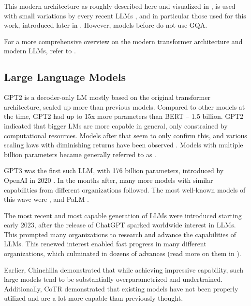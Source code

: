

This modern architecture as roughly described here and visualized in , is used with small variations by every recent \glspl{LLM} \cite{naveed_comprehensive_2023}, and in particular those used for this work, introduced later in .
However, models before  do not use \gls{GQA}.

For a more comprehensive overview on the modern transformer architecture and modern \glspl{LLM}, refer to \cite{naveed_comprehensive_2023}.

\subsection{Large Language Models}\label{sub:llm}

\gls{GPT2} \cite{radford_language_2019} is a decoder-only \gls{LM} mostly based on the original transformer architecture, scaled up more than previous models.
Compared to other models at the time, \gls{GPT2} had up to 15x more parameters than \gls{BERT} -- 1.5 billion.
\gls{GPT2} indicated that bigger \glspl{LM} are more capable in general, only constrained by computational resources.
Models after that seem to only confirm this, and various scaling laws with diminishing returns have been observed \cite{rae_scaling_2022, hoffmann_training_2022}.
Models with multiple billion parameters became generally referred to as .

\gls{GPT3} was the first such \gls{LLM}, with 176 billion parameters, introduced by \gls{OpenAI} in 2020 \cite{brown_language_2020}.
In the months after, many more models with similar capabilities from different organizations followed.
The most well-known models of this wave were ,  and \gls{PaLM} \cite{chowdhery_palm_2022}.


The most recent and most capable generation of \glspl{LLM} were introduced starting early 2023, after the release of \gls{ChatGPT} sparked worldwide interest in \glspl{LLM}.
This prompted many organizations to research and advance the capabilities of \glspl{LLM}.
This renewed interest enabled fast progress in many different organizations, which culminated in dozens of advances (read more on them in ).

Earlier, Chinchilla \cite{hoffmann_training_2022} demonstrated that while achieving impressive capability, such large models tend to be substantially overparametrized and undertrained.
Additionally, CoTR \cite{zhang_multimodal_2023} demonstrated that existing models have not been properly utilized and are a lot more capable than previously thought.

